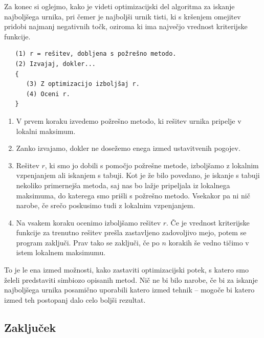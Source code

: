 \documentclass[a4paper,10pt]{article}
\begin{document}
Za konec si oglejmo, kako je videti optimizacijski del algoritma za iskanje najboljšega
urnika, pri čemer je najboljši urnik tisti, ki s kršenjem omejitev pridobi najmanj negativnih
točk, oziroma ki ima največjo vrednost kriterijske funkcije.


\begin{verbatim}
   (1) r = rešitev, dobljena s požrešno metodo.
   (2) Izvajaj, dokler...
   {
      (3) Z optimizacijo izboljšaj r.
      (4) Oceni r.
   }
\end{verbatim}


   \begin{enumerate}
      \item V prvem koraku izvedemo požrešno metodo, ki rešitev urnika pripelje v lokalni maksimum.
   
      \item Zanko izvajamo, dokler ne dosežemo enega izmed ustavitvenih pogojev.
   
      \item Rešitev \(r\), ki smo jo dobili s pomočjo požrešne metode, izboljšamo z lokalnim vzpenjanjem
      ali iskanjem s tabuji. Kot je že bilo povedano, je iskanje s tabuji nekoliko primernejša metoda,
      saj nas bo lažje pripeljala iz lokalnega maksimuma, do katerega smo prišli s požrešno metodo.
      Vsekakor pa ni nič narobe, če srečo poskusimo tudi z lokalnim vzpenjanjem.
   
      \item Na vsakem koraku ocenimo izboljšamo rešitev \(r\). Če je vrednost kriterijske funkcije
      za trenutno rešitev prešla zastavljeno zadovoljivo mejo, potem se program zaključi. Prav tako
      se zaključi, če po \(n\) korakih še vedno tičimo v istem lokalnem maksimumu.
   \end{enumerate}

\noindent
To je le ena izmed možnosti, kako zastaviti optimizacijski potek, s katero smo želeli predstaviti
simbiozo opisanih metod. Nič ne bi bilo narobe, če bi za iskanje najboljšega urnika posamično
uporabili katero izmed tehnik -- mogoče bi katero izmed teh postopanj dalo celo boljši rezultat.

\subsection{Zaključek}
\end{document}
